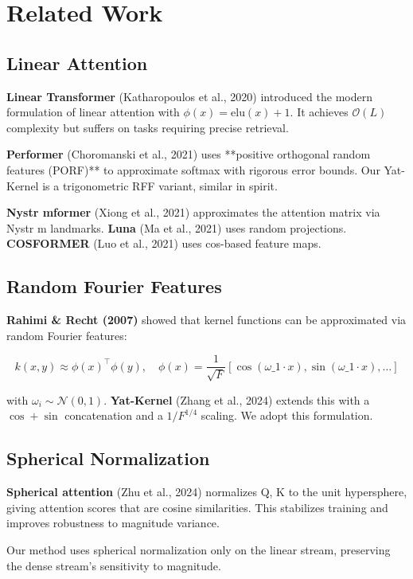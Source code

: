 \section{Related Work}

\subsection{Linear Attention}

\textbf{Linear Transformer} (Katharopoulos et al., 2020) introduced the modern 
formulation of linear attention with $\phi(x) = \text{elu}(x) + 1$. It 
achieves $\mathcal{O}(L)$ complexity but suffers on tasks requiring precise 
retrieval.

\textbf{Performer} (Choromanski et al., 2021) uses **positive orthogonal random 
features (PORF)** to approximate softmax with rigorous error bounds. Our 
Yat-Kernel is a trigonometric RFF variant, similar in spirit.

\textbf{Nystr mformer} (Xiong et al., 2021) approximates the attention matrix 
via Nystr m landmarks. \textbf{Luna} (Ma et al., 2021) uses random projections. 
\textbf{COSFORMER} (Luo et al., 2021) uses cos-based feature maps.

\subsection{Random Fourier Features}

\textbf{Rahimi \& Recht (2007)} showed that kernel functions can be approximated 
via random Fourier features:

\[
k(x, y) \approx \phi(x)^\top \phi(y), \quad
\phi(x) = \frac{1}{\sqrt{F}} \left[ \cos(\omega\_1 \cdot x), \sin(\omega\_1 \cdot x), \dots \right]
\]

with $\omega_i \sim \mathcal{N}(0, 1)$. \textbf{Yat-Kernel} (Zhang et al., 2024) 
extends this with a $\cos + \sin$ concatenation and a $1/F^{1/4}$ scaling. 
We adopt this formulation.

\subsection{Spherical Normalization}

\textbf{Spherical attention} (Zhu et al., 2024) normalizes Q, K to the unit 
hypersphere, giving attention scores that are cosine similarities. This 
stabilizes training and improves robustness to magnitude variance.

Our method uses spherical normalization only on the linear stream, 
preserving the dense stream's sensitivity to magnitude.

